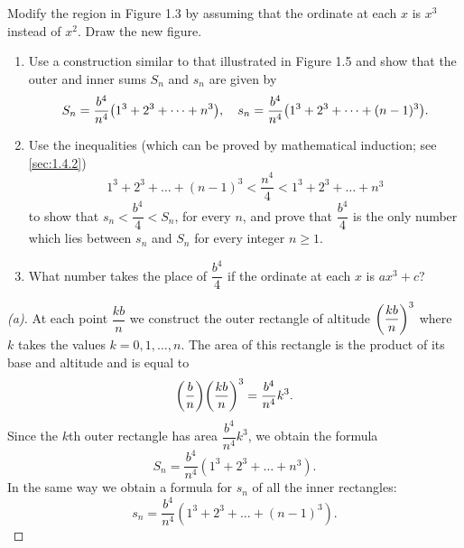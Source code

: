 \begin{ex}\label{ex:1.1.4.2}
  Modify the region in Figure 1.3 by assuming that the ordinate at each \(x\) is \(x^3\) instead of \(x^2\).
  Draw the new figure.
  \begin{enumerate}
    \item Use a construction similar to that illustrated in Figure 1.5 and show that the outer and inner sums \(S_n\) and \(s_n\) are given by
          \[
            S_n = \dfrac{b^4}{n^4} \pa{1^3 + 2^3 + \dots + n^3}, \quad s_n = \dfrac{b^4}{n^4} \pa{1^3 + 2^3 + \dots + (n - 1)^3}.
          \]
    \item Use the inequalities
          (which can be proved by mathematical induction;
          see \cref{sec:1.4.2})
          \begin{equation}\label{eq:1.1.12}
            1^3 + 2^3 + \dots + (n - 1)^3 < \dfrac{n^4}{4} < 1^3 + 2^3 + \dots + n^3
          \end{equation}
          to show that \(s_n < \dfrac{b^4}{4} < S_n\), for every \(n\), and prove that \(\dfrac{b^4}{4}\) is the only number which lies between \(s_n\) and \(S_n\) for every integer \(n \geq 1\).
    \item What number takes the place of \(\dfrac{b^4}{4}\) if the ordinate at each \(x\) is \(ax^3 + c\)?
  \end{enumerate}
\end{ex}

\begin{proof}[(a)]
  At each point \(\dfrac{kb}{n}\) we construct the outer rectangle of altitude \(\left\lparen\dfrac{kb}{n}\right\rparen^3\) where \(k\) takes the values \(k = 0, 1, \dots, n\).
  The area of this rectangle is the product of its base and altitude and is equal to
  \[
    \pa{\dfrac{b}{n}} \pa{\dfrac{kb}{n}}^3 = \dfrac{b^4}{n^4} k^3.
  \]
  Since the \(k\)th outer rectangle has area \(\dfrac{b^4}{n^4} k^3\), we obtain the formula
  \[
    S_n = \dfrac{b^4}{n^4} (1^3 + 2^3 + \dots + n^3).
  \]
  In the same way we obtain a formula for \(s_n\) of all the inner rectangles:
  \[
    s_n = \dfrac{b^4}{n^4} (1^3 + 2^3 + \dots + (n - 1)^3).
  \]
\end{proof}

